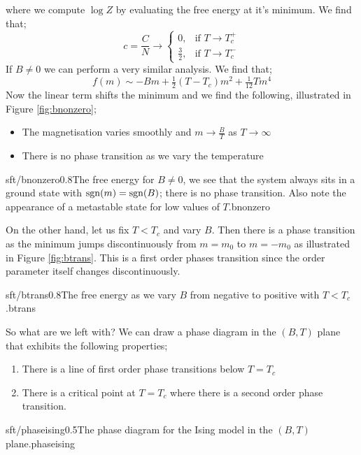 where we compute $\log Z$ by evaluating the free energy at it's minimum. We find that;
\begin{equation}
c = \frac{C}{N} \rightarrow 
\begin{cases}
   0, & \text{if } T \rightarrow T_{c}^{+} \\
   \tfrac{3}{2}, & \text{if } T \rightarrow T_{c}^{-}
\end{cases}
\end{equation}
If $B \neq 0$ we can perform a very similar analysis. We find that;
\begin{dmath}
f(m) \sim -B m + \tfrac{1}{2} (T - T_c) m^2 + \tfrac{1}{12} T m^4
\end{dmath}
Now the linear term shifts the minimum and we find the following, illustrated in Figure \ref{fig:bnonzero};
\begin{itemize}
\item The magnetisation varies smoothly and $m \rightarrow \tfrac{B}{T}$ as $T \rightarrow \infty$
\item There is no phase transition as we vary the temperature
\end{itemize}
\begin{mygraphic}{sft/bnonzero}{0.8}{The free energy for $B \neq 0$, we see that the system always sits in a ground state with $\operatorname{sgn}(m) = \operatorname{sgn}(B)$; there is no phase transition. Also note the appearance of a metastable state for low values of $T$.}{bnonzero}\end{mygraphic}
On the other hand, let us fix $T < T_c$ and vary $B$. Then there is a phase transition as the minimum jumps discontinuously from $m = m_0$ to $m = -m_0$ as illustrated in Figure \ref{fig:btrans}. This is a first order phases transition since the order parameter itself changes discontinuously.
\begin{mygraphic}{sft/btrans}{0.8}{The free energy as we vary $B$ from negative to positive with $T < T_c$.}{btrans}\end{mygraphic}
So what are we left with? We can draw a phase diagram in the $(B, T)$ plane that exhibits the following properties;
\begin{enumerate}
\item There is a line of first order phase transitions below $T = T_c$
\item There is a critical point at $T = T_c$ where there is a second order phase transition.
\end{enumerate}
\begin{mygraphic}{sft/phaseising}{0.5}{The phase diagram for the Ising model in the $(B, T)$ plane.}{phaseising}\end{mygraphic}
